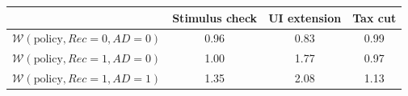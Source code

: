 \begin{tabular}{@{}lccc@{}} 
\toprule 
                          & Stimulus check      & UI extension    & Tax cut    \\  \midrule 
$\mathcal{W}(\text{policy}, Rec=0, AD=0)$ & 0.96  & 0.83  & 0.99     \\ 
$\mathcal{W}(\text{policy}, Rec=1, AD=0)$ & 1.00  & 1.77  & 0.97     \\ 
$\mathcal{W}(\text{policy}, Rec=1, AD=1)$ & 1.35  & 2.08  & 1.13     \\ \bottomrule 
\end{tabular}  
